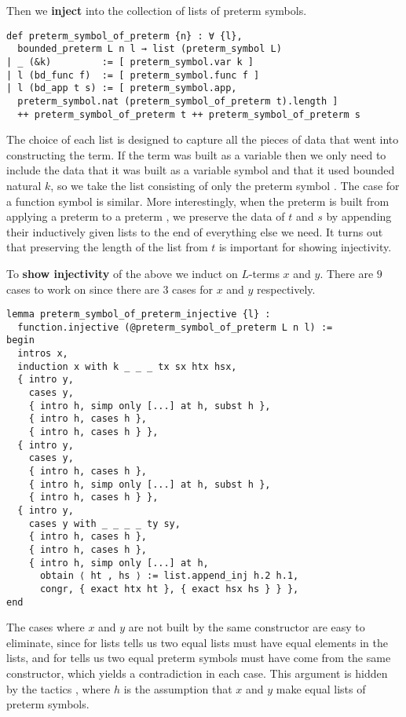 Then we \textbf{inject} 
into the collection of lists of preterm symbols.

\begin{lstlisting}
def preterm_symbol_of_preterm {n} : ∀ {l},
  bounded_preterm L n l → list (preterm_symbol L)
| _ (&k)         := [ preterm_symbol.var k ]
| l (bd_func f)  := [ preterm_symbol.func f ]
| l (bd_app t s) := [ preterm_symbol.app,
  preterm_symbol.nat (preterm_symbol_of_preterm t).length ]
  ++ preterm_symbol_of_preterm t ++ preterm_symbol_of_preterm s
 \end{lstlisting}

The choice of each list is designed to capture all
the pieces of data that went into constructing the term.
If the term was built as a variable 
then we only need to include the data that
it was built as a variable symbol and that it used bounded natural $k$,
so we take the list consisting of only
the preterm symbol .
The case for a function symbol is similar.
More interestingly, when the preterm is built from
applying a preterm 
to a preterm ,
we preserve the data of $t$ and $s$ by appending their
inductively given lists to the end of everything else we need.
It turns out that preserving the length of the list from $t$
is important for showing injectivity.

To \textbf{show injectivity} of the above we induct on $L$-terms $x$ and $y$.
There are $9$ cases to work on since there are $3$ cases for $x$ and $y$
respectively.

\begin{lstlisting}
lemma preterm_symbol_of_preterm_injective {l} :
  function.injective (@preterm_symbol_of_preterm L n l) :=
begin
  intros x,
  induction x with k _ _ _ tx sx htx hsx,
  { intro y,
    cases y,
    { intro h, simp only [...] at h, subst h },
    { intro h, cases h },
    { intro h, cases h } },
  { intro y,
    cases y,
    { intro h, cases h },
    { intro h, simp only [...] at h, subst h },
    { intro h, cases h } },
  { intro y,
    cases y with _ _ _ _ ty sy,
    { intro h, cases h },
    { intro h, cases h },
    { intro h, simp only [...] at h,
      obtain ⟨ ht , hs ⟩ := list.append_inj h.2 h.1,
      congr, { exact htx ht }, { exact hsx hs } } },
end \end{lstlisting}

The cases where $x$ and $y$ are not built by the same constructor
are easy to eliminate, since 
for lists tells us two equal lists must have equal elements in the lists,
and  for  tells us
two equal preterm symbols must have come from the same constructor,
which yields a contradiction in each case.
This argument is hidden by the tactics ,
where $h$ is the assumption that $x$ and $y$
make equal lists of preterm symbols.

